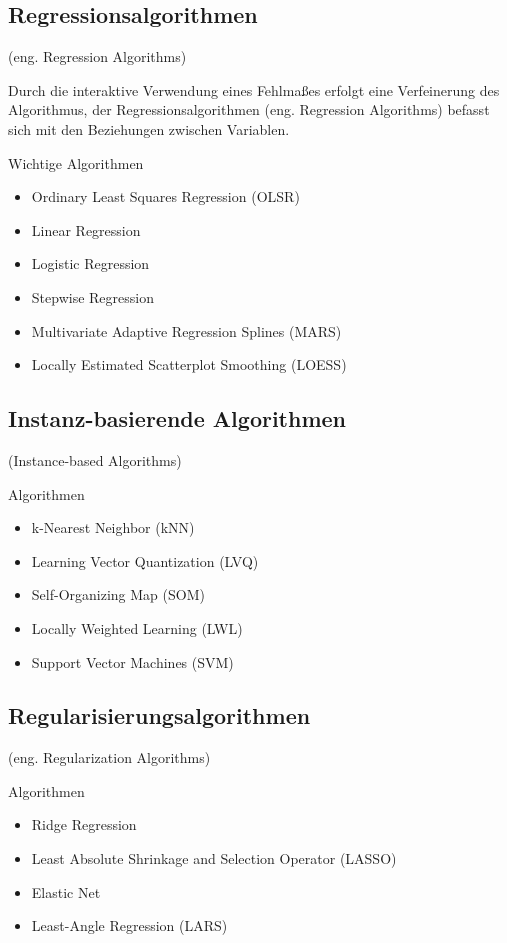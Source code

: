 \subsection{Regressionsalgorithmen}
(eng. Regression Algorithms)\vspace{0.2cm}

Durch die interaktive Verwendung eines Fehlmaßes erfolgt eine Verfeinerung des Algorithmus, der Regressionsalgorithmen (eng. Regression Algorithms) befasst sich mit den Beziehungen zwischen Variablen.\vspace{0.2cm}

Wichtige Algorithmen
\begin{itemize}
	\item Ordinary Least Squares Regression (OLSR)
	\item Linear Regression
	\item Logistic Regression
	\item Stepwise Regression
	\item Multivariate Adaptive Regression Splines (MARS)
	\item Locally Estimated Scatterplot Smoothing (LOESS)
\end{itemize}

\subsection{Instanz-basierende Algorithmen}
(Instance-based Algorithms)\vspace{0.2cm}

Algorithmen
\begin{itemize}
	\item k-Nearest Neighbor (kNN)
	\item Learning Vector Quantization (LVQ)
	\item Self-Organizing Map (SOM)
	\item Locally Weighted Learning (LWL)
	\item Support Vector Machines (SVM)
\end{itemize}

\subsection{Regularisierungsalgorithmen}
(eng. Regularization Algorithms)\vspace{0.2cm}

Algorithmen
\begin{itemize}
	\item Ridge Regression
	\item Least Absolute Shrinkage and Selection Operator (LASSO)
	\item Elastic Net
	\item Least-Angle Regression (LARS)
\end{itemize}

